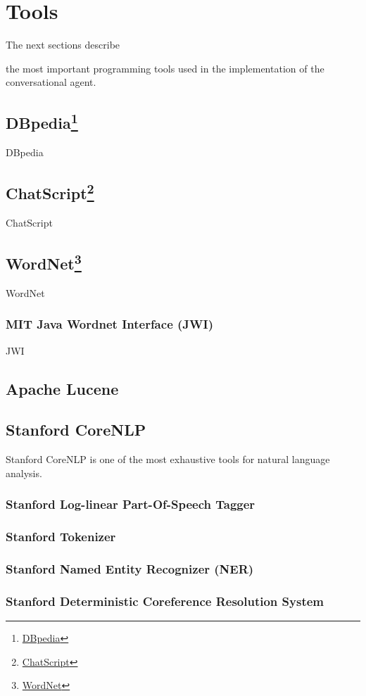 \chapter{Tools}
\label{chapter:tools}

The next sections describe  the most important programming tools used in the implementation of the conversational agent. 

\section[DBpedia]{DBpedia\footnote{\href{dbpedia.org}{DBpedia}}}
\label{sec:dbpedia}

DBpedia  \cite{Auer2007}

\section[ChatScript]{ChatScript\footnote{\href{http://chatscript.sourceforge.net/}{ChatScript}}}
\label{sec:chatscript}

ChatScript  \cite{Wilcox2011}

\section[WordNet]{WordNet\footnote{\href{http://wordnetweb.princeton.edu/perl/webwn}{WordNet}}}
\label{sec:wordnet}

WordNet \cite{Miller1995}

\subsection{MIT Java Wordnet Interface (JWI)}
\label{sub-sec:wordnet-jwi}

JWI \cite{Finlayson2013}

\section{Apache Lucene}
\label{sec:lucene}

\section{Stanford CoreNLP}
\label{sec:corenlp}

Stanford CoreNLP is one of the most exhaustive tools for natural language analysis. \cite{Manning2014}

\subsection{Stanford Log-linear Part-Of-Speech Tagger}
\label{sub-sec:stanford-pos}

\subsection{Stanford Tokenizer}
\label{sub-sec:stanford-tokenizer}

\subsection{Stanford Named Entity Recognizer (NER)}
\label{sub-sec:stanford-ner}

\subsection{Stanford Deterministic Coreference Resolution System}
\label{sub-sec:stanford-dcoref}

